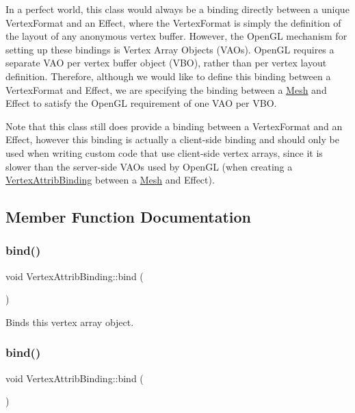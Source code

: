 In a perfect world, this class would always be a binding directly between a unique Vertex\+Format and an Effect, where the Vertex\+Format is simply the definition of the layout of any anonymous vertex buffer. However, the Open\+GL mechanism for setting up these bindings is Vertex Array Objects (V\+A\+Os). Open\+GL requires a separate V\+AO per vertex buffer object (V\+BO), rather than per vertex layout definition. Therefore, although we would like to define this binding between a Vertex\+Format and Effect, we are specifying the binding between a \hyperlink{classMesh}{Mesh} and Effect to satisfy the Open\+GL requirement of one V\+AO per V\+BO.

Note that this class still does provide a binding between a Vertex\+Format and an Effect, however this binding is actually a client-\/side binding and should only be used when writing custom code that use client-\/side vertex arrays, since it is slower than the server-\/side V\+A\+Os used by Open\+GL (when creating a \hyperlink{classVertexAttribBinding}{Vertex\+Attrib\+Binding} between a \hyperlink{classMesh}{Mesh} and Effect). 

\subsection{Member Function Documentation}
\mbox{\label{classVertexAttribBinding_a73d048fbb2ca9b0450b24c68024755d0}} 
\subsubsection{\texorpdfstring{bind()}{bind()}\hspace{0.1cm}{\footnotesize\ttfamily [1/2]}}
{\footnotesize\ttfamily void Vertex\+Attrib\+Binding\+::bind (\begin{DoxyParamCaption}{ }\end{DoxyParamCaption})}

Binds this vertex array object. \mbox{\label{classVertexAttribBinding_a73d048fbb2ca9b0450b24c68024755d0}} 
\subsubsection{\texorpdfstring{bind()}{bind()}\hspace{0.1cm}{\footnotesize\ttfamily [2/2]}}
{\footnotesize\ttfamily void Vertex\+Attrib\+Binding\+::bind (\begin{DoxyParamCaption}{ }\end{DoxyParamCaption})}

